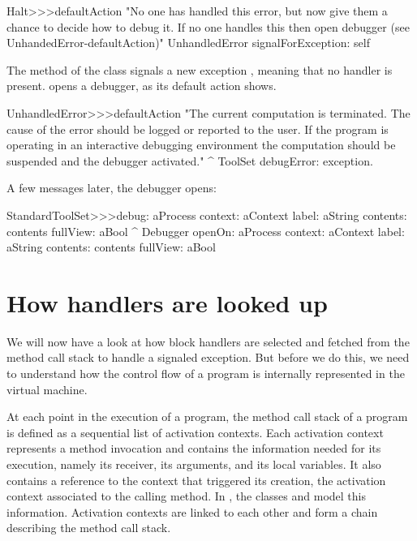 \documentclass[a4paper,10pt,twoside]{book}
\begin{document}
\begin{code}{}
Halt>>>defaultAction
	"No one has handled this error, but now give them a chance to decide
	how to debug it.  If no one handles this then open debugger
	(see UnhandedError-defaultAction)"
	UnhandledError signalForException: self
\end{code}

The method   of the  class signals a new exception , meaning that no handler is present.  opens a debugger, as its default action shows.

\begin{code}{}
UnhandledError>>>defaultAction
	"The current computation is terminated. The cause of the error should be logged or reported to the user. If the program is operating in an interactive debugging environment the computation should be suspended and the debugger activated."
	^ ToolSet debugError: exception.
\end{code}

A few messages later, the debugger opens:

\begin{code}{}
StandardToolSet>>>debug: aProcess context: aContext label: aString contents: contents fullView: aBool
	^ Debugger openOn: aProcess context: aContext label: aString contents: contents fullView: aBool
\end{code}

\section{How handlers are looked up}

We will now have a look at how block handlers are selected and fetched from the method call stack to handle a signaled exception. But before we do this, we need to understand how the control flow of a program is internally represented in the virtual machine.

At each point in the execution of a program, the method call stack of a program is defined as a sequential list of activation contexts. Each activation context represents a method invocation and contains the information needed for its execution, namely its receiver, its arguments, and its local variables. It also contains a reference to the context that triggered its creation, \ie the activation context associated to the calling method. In \pharo, the classes  and  model this information. Activation contexts are linked to each other and form a chain describing the method call stack.
\end{document}
